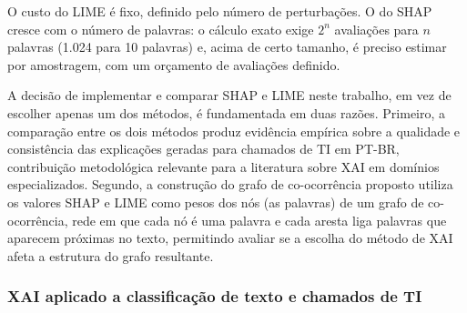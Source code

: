 \documentclass[
    12pt,                %
    openright,           %
    oneside,             %
    a4paper,             %
    english,             %
    brazil               %
]{abntex2}
\begin{document}
\label{subsubsec:comparacao_custo}

O custo do LIME é fixo, definido pelo número de perturbações. O do SHAP cresce com o número de palavras: o cálculo exato exige $2^n$ avaliações para $n$ palavras (1.024 para 10 palavras) e, acima de certo tamanho, é preciso estimar por amostragem, com um orçamento de avaliações definido.
\label{subsubsec:comparacao_justificativa}

A decisão de implementar e comparar SHAP e LIME neste trabalho, em vez de escolher apenas um dos métodos, é fundamentada em duas razões. Primeiro, a comparação entre os dois métodos produz evidência empírica sobre a qualidade e consistência das explicações geradas para chamados de TI em PT-BR, contribuição metodológica relevante para a literatura sobre XAI em domínios especializados. Segundo, a construção do grafo de co-ocorrência proposto utiliza os valores SHAP e LIME como pesos dos nós (as palavras) de um grafo de co-ocorrência, rede em que cada nó é uma palavra e cada aresta liga palavras que aparecem próximas no texto, permitindo avaliar 
se a escolha do método de XAI afeta a estrutura do grafo resultante.

\subsubsection{XAI aplicado a classificação de texto e chamados de TI}
\label{subsec:xai_aplicado}

\label{subsubsec:xai_mustafa}
\end{document}
